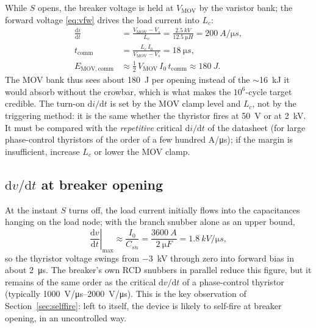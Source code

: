 \documentclass[11pt,a4paper]{article}
\begin{document}
While $S$ opens, the breaker voltage is held at $V_{\mathrm{MOV}}$ by the varistor bank; the
forward voltage \eqref{eq:vfw} drives the load current into $L_c$:
\begin{align}
  \frac{\mathrm{d}i}{\mathrm{d}t} &= \frac{V_{\mathrm{MOV}} - V_s}{L_c}
      = \frac{\SI{2.5}{kV}}{\SI{12.5}{\micro H}} = \SI{200}{A/\micro s}, \\
  t_{\mathrm{comm}} &= \frac{L_c\,I_0}{V_{\mathrm{MOV}} - V_s} = \SI{18}{\micro s}, \\
  E_{\mathrm{MOV,comm}} &\approx \tfrac12\,V_{\mathrm{MOV}}\,I_0\,t_{\mathrm{comm}} \approx \SI{180}{J}.
\end{align}
The MOV bank thus sees about \SI{180}{J} per opening instead of the $\sim$\SI{16}{kJ} it would
absorb without the crowbar, which is what makes the $10^6$-cycle target credible.
The turn-on $\mathrm{d}i/\mathrm{d}t$ is set by the MOV clamp level and $L_c$, not by the
triggering method: it is the same whether the thyristor fires at \SI{50}{V} or at \SI{2}{kV}.
It must be compared with the \emph{repetitive} critical $\mathrm{d}i/\mathrm{d}t$ of the
datasheet (for large phase-control thyristors of the order of a few hundred \si{A/\micro s});
if the margin is insufficient, increase $L_c$ or lower the MOV clamp.

\subsection{$\mathrm{d}v/\mathrm{d}t$ at breaker opening}

At the instant $S$ turns off, the load current initially flows into the capacitances hanging on
the load node; with the branch snubber alone as an upper bound,
\begin{equation}
  \left.\frac{\mathrm{d}v}{\mathrm{d}t}\right|_{\max} \approx \frac{I_0}{C_{sn}}
  = \frac{\SI{3600}{A}}{\SI{2}{\micro F}} = \SI{1.8}{kV/\micro s},
  \label{eq:dvdt}
\end{equation}
so the thyristor voltage swings from \SI{-3}{kV} through zero into forward bias in about
\SI{2}{\micro s}. The breaker's own RCD snubbers in parallel reduce this figure, but it remains
of the same order as the critical $\mathrm{d}v/\mathrm{d}t$ of a phase-control thyristor
(typically \SIrange{1000}{2000}{V/\micro s}). This is the key observation of
Section~\ref{sec:selffire}: left to itself, the device is likely to self-fire at breaker
opening, in an uncontrolled way.

\end{document}
